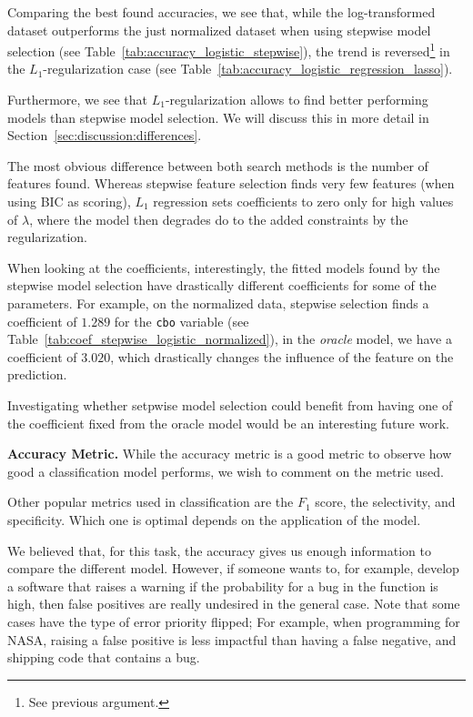 Comparing the best found accuracies, we see that, while the log-transformed dataset outperforms the just normalized dataset when using stepwise model selection (see Table~\ref{tab:accuracy_logistic_stepwise}), the trend is reversed\footnote{See previous argument.} in the $L_1$-regularization case (see Table~\ref{tab:accuracy_logistic_regression_lasso}).

Furthermore, we see that $L_1$-regularization allows to find better performing models than stepwise model selection. 
We will discuss this in more detail in Section~\ref{sec:discussion:differences}.

The most obvious difference between both search methods is the number of features found. Whereas stepwise feature selection finds very few features (when using BIC as scoring), $L_1$ regression sets coefficients to zero only for high values of $\lambda$, where the model then degrades do to the added constraints by the regularization.

When looking at the coefficients, interestingly, the fitted models found by the stepwise model selection have drastically different coefficients for some of the parameters. For example, on the normalized data, stepwise selection finds a coefficient of $1.289$ for the \texttt{cbo} variable (see Table~\ref{tab:coef_stepwise_logistic_normalized}), in the \textit{oracle} model, we have a coefficient of $3.020$, which drastically changes the influence of the feature on the prediction. 

Investigating whether setpwise model selection could benefit from having one of the coefficient fixed from the oracle model would be an interesting future work.

\textbf{Accuracy Metric.}
While the accuracy metric is a good metric to observe how good a classification model performs, we wish to comment on the metric used.

Other popular metrics used in classification are the $F_1$ score, the selectivity, and specificity.
Which one is optimal depends on the application of the model.

We believed that, for this task, the accuracy gives us enough information to compare the different model.
However, if someone wants to, for example, develop a software that raises a warning if the probability for a bug in the function is high, then false positives are really undesired in the general case. Note that some cases have the type of error priority flipped; For example, when programming for NASA, raising a false positive is less impactful than having a false negative, and shipping code that contains a bug.

